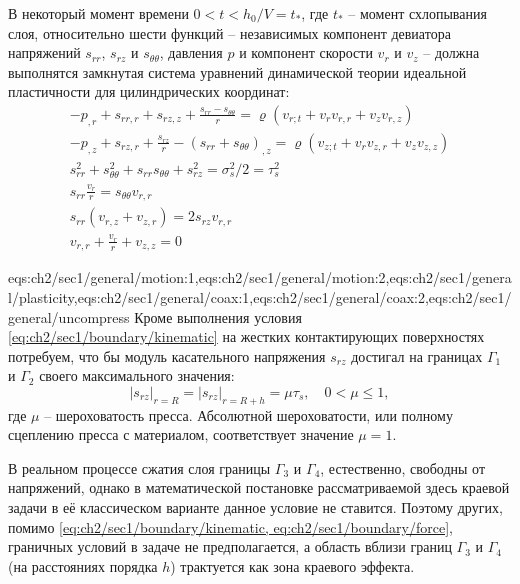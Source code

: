 В некоторый момент времени $0 < t < h_{0}/V = t_*$, где $t_*$ -- момент схлопывания слоя, относительно шести функций -- независимых компонент девиатора напряжений $s_{rr}$, $s_{rz}$ и $s_{\theta\theta}$, давления $p$ и компонент скорости $v_{r}$ и $v_{z}$ -- должна выполнятся замкнутая система уравнений динамической теории идеальной пластичности для цилиндрических координат:
\begin{gather}
  \label{eqs:ch2/sec1/general/motion:1}
  -p_{,r}+s_{rr,r}+s_{rz,z}+\frac{s_{rr}-s_{\theta\theta}}{r} = \varrho \left(v_{r;t}+v_{r} v_{r,r} + v_{z} v_{r,z} \right)
  \\
  \label{eqs:ch2/sec1/general/motion:2}
  -p_{,z}+s_{rz,r}+\frac{s_{rz}}{r}-(s_{rr}+s_{\theta\theta})_{,z} = \varrho \left(v_{z;t}+v_{r} v_{z,r} + v_{z} v_{z,z} \right)
  \\
  \label{eqs:ch2/sec1/general/plasticity}
  s^2_{rr}+s^2_{\theta\theta}+s_{rr} s_{\theta\theta} + s^2_{rz}=\sigma^2_{s} / 2 = \tau^2_{s}
  \\
  \label{eqs:ch2/sec1/general/coax:1}
  s_{rr} \frac{v_{r}}{r} = s_{\theta\theta} v_{r,r}
  \\
  \label{eqs:ch2/sec1/general/coax:2}
  s_{rr} (v_{r,z}+v_{z,r}) = 2 s_{rz} v_{r,r}
  \\
  \label{eqs:ch2/sec1/general/uncompress}
  v_{r,r}+\frac{v_{r}}{r}+v_{z,z} = 0
\end{gather}

\expandafter\gdef\csname eqs:ch2/sec1/general\endcsname{eqs:ch2/sec1/general/motion:1,eqs:ch2/sec1/general/motion:2,eqs:ch2/sec1/general/plasticity,eqs:ch2/sec1/general/coax:1,eqs:ch2/sec1/general/coax:2,eqs:ch2/sec1/general/uncompress}
Кроме выполнения условия \cref{eq:ch2/sec1/boundary/kinematic} на жестких контактирующих поверхностях потребуем, что бы модуль касательного напряжения $s_{rz}$ достигал на границах $\Gamma_{1}$ и $\Gamma_{2}$ своего максимального значения:
\begin{equation}
  \label{eq:ch2/sec1/boundary/force}
  \lvert s_{rz}\lvert_{r=R} = \lvert s_{rz}\lvert_{r=R+h} = \mu \tau_{s}, \quad 0 < \mu \le 1,
\end{equation}
где $\mu$ -- шероховатость пресса. Абсолютной шероховатости, или полному сцеплению пресса с материалом, соответствует значение $\mu = 1$.

В реальном процессе сжатия слоя границы $\Gamma_{3}$ и $\Gamma_{4}$, естественно, свободны от напряжений, однако в математической постановке рассматриваемой здесь краевой задачи в её классическом варианте данное условие не ставится. Поэтому других, помимо \cref{eq:ch2/sec1/boundary/kinematic, eq:ch2/sec1/boundary/force}, граничных условий в задаче не предполагается, а область вблизи границ $\Gamma_{3}$ и $\Gamma_{4}$(на расстояниях порядка $h$) трактуется как зона краевого эффекта.

